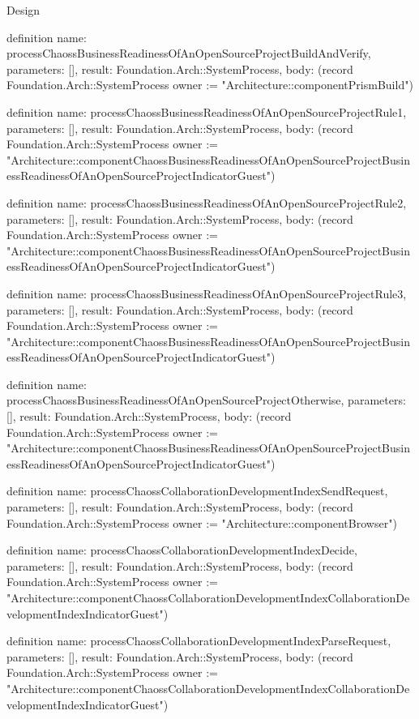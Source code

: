 \begin{lexlean}{Design}
\begin{semanticmodule}
definition{
  name: processChaossBusinessReadinessOfAnOpenSourceProjectBuildAndVerify,
  parameters: [],
  result: Foundation.Arch::SystemProcess,
  body: (record Foundation.Arch::SystemProcess {owner := "Architecture::componentPrismBuild"})
}

definition{
  name: processChaossBusinessReadinessOfAnOpenSourceProjectRule1,
  parameters: [],
  result: Foundation.Arch::SystemProcess,
  body: (record Foundation.Arch::SystemProcess {owner := "Architecture::componentChaossBusinessReadinessOfAnOpenSourceProjectBusinessReadinessOfAnOpenSourceProjectIndicatorGuest"})
}

definition{
  name: processChaossBusinessReadinessOfAnOpenSourceProjectRule2,
  parameters: [],
  result: Foundation.Arch::SystemProcess,
  body: (record Foundation.Arch::SystemProcess {owner := "Architecture::componentChaossBusinessReadinessOfAnOpenSourceProjectBusinessReadinessOfAnOpenSourceProjectIndicatorGuest"})
}

definition{
  name: processChaossBusinessReadinessOfAnOpenSourceProjectRule3,
  parameters: [],
  result: Foundation.Arch::SystemProcess,
  body: (record Foundation.Arch::SystemProcess {owner := "Architecture::componentChaossBusinessReadinessOfAnOpenSourceProjectBusinessReadinessOfAnOpenSourceProjectIndicatorGuest"})
}

definition{
  name: processChaossBusinessReadinessOfAnOpenSourceProjectOtherwise,
  parameters: [],
  result: Foundation.Arch::SystemProcess,
  body: (record Foundation.Arch::SystemProcess {owner := "Architecture::componentChaossBusinessReadinessOfAnOpenSourceProjectBusinessReadinessOfAnOpenSourceProjectIndicatorGuest"})
}

definition{
  name: processChaossCollaborationDevelopmentIndexSendRequest,
  parameters: [],
  result: Foundation.Arch::SystemProcess,
  body: (record Foundation.Arch::SystemProcess {owner := "Architecture::componentBrowser"})
}

definition{
  name: processChaossCollaborationDevelopmentIndexDecide,
  parameters: [],
  result: Foundation.Arch::SystemProcess,
  body: (record Foundation.Arch::SystemProcess {owner := "Architecture::componentChaossCollaborationDevelopmentIndexCollaborationDevelopmentIndexIndicatorGuest"})
}

definition{
  name: processChaossCollaborationDevelopmentIndexParseRequest,
  parameters: [],
  result: Foundation.Arch::SystemProcess,
  body: (record Foundation.Arch::SystemProcess {owner := "Architecture::componentChaossCollaborationDevelopmentIndexCollaborationDevelopmentIndexIndicatorGuest"})
}


\end{semanticmodule}
\end{lexlean}
